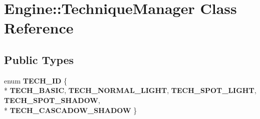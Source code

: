 \hypertarget{classEngine_1_1TechniqueManager}{}\section{Engine\+:\+:Technique\+Manager Class Reference}
\label{classEngine_1_1TechniqueManager}
\subsection*{Public Types}
\begin{DoxyCompactItemize}
\item 
\hypertarget{classEngine_1_1TechniqueManager_a064ac997745d3e66fbdb4da2501c81f6}{}enum {\bfseries T\+E\+C\+H\+\_\+\+I\+D} \{ \\*
{\bfseries T\+E\+C\+H\+\_\+\+B\+A\+S\+I\+C}, 
{\bfseries T\+E\+C\+H\+\_\+\+N\+O\+R\+M\+A\+L\+\_\+\+L\+I\+G\+H\+T}, 
{\bfseries T\+E\+C\+H\+\_\+\+S\+P\+O\+T\+\_\+\+L\+I\+G\+H\+T}, 
{\bfseries T\+E\+C\+H\+\_\+\+S\+P\+O\+T\+\_\+\+S\+H\+A\+D\+O\+W}, 
\\*
{\bfseries T\+E\+C\+H\+\_\+\+C\+A\+S\+C\+A\+D\+O\+W\+\_\+\+S\+H\+A\+D\+O\+W}
 \}\label{classEngine_1_1TechniqueManager_a064ac997745d3e66fbdb4da2501c81f6}

\end{DoxyCompactItemize}
